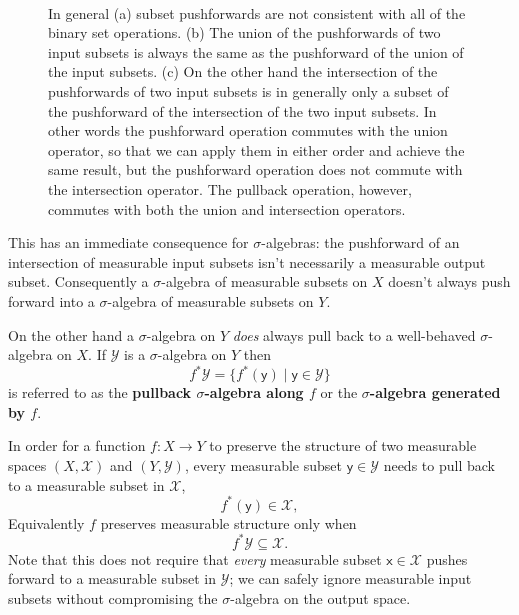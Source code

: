 \documentclass[
  letterpaper,
  DIV=11,
  numbers=noendperiod]{scrartcl}
\begin{document}
\begin{figure}
\begin{minipage}[t]{0.18\linewidth}
{\centering 

~

}

\end{minipage}%

\caption{\label{fig-set-op-consistency}In general (a) subset
pushforwards are not consistent with all of the binary set operations.
(b) The union of the pushforwards of two input subsets is always the
same as the pushforward of the union of the input subsets. (c) On the
other hand the intersection of the pushforwards of two input subsets is
in generally only a subset of the pushforward of the intersection of the
two input subsets. In other words the pushforward operation commutes
with the union operator, so that we can apply them in either order and
achieve the same result, but the pushforward operation does not commute
with the intersection operator. The pullback operation, however,
commutes with both the union and intersection operators.}

\end{figure}

This has an immediate consequence for \(\sigma\)-algebras: the
pushforward of an intersection of measurable input subsets isn't
necessarily a measurable output subset. Consequently a
\(\sigma\)-algebra of measurable subsets on \(X\) doesn't always push
forward into a \(\sigma\)-algebra of measurable subsets on \(Y\).

On the other hand a \(\sigma\)-algebra on \(Y\) \emph{does} always pull
back to a well-behaved \(\sigma\)-algebra on \(X\). If \(\mathcal{Y}\)
is a \(\sigma\)-algebra on \(Y\) then \[
f^{*} \mathcal{Y} =
\{ f^{*}(\mathsf{y}) \mid \mathsf{y} \in \mathcal{Y} \}
\] is referred to as the \textbf{pullback \(\sigma\)-algebra along
\(f\)} or the \textbf{\(\sigma\)-algebra generated by \(f\)}.

In order for a function \(f: X \rightarrow Y\) to preserve the structure
of two measurable spaces \((X, \mathcal{X})\) and \((Y, \mathcal{Y})\),
every measurable subset \(\mathsf{y} \in \mathcal{Y}\) needs to pull
back to a measurable subset in \(\mathcal{X}\), \[
f^{*}(\mathsf{y}) \in \mathcal{X},
\] Equivalently \(f\) preserves measurable structure only when \[
f^{*} \mathcal{Y} \subseteq \mathcal{X}.
\] Note that this does not require that \emph{every} measurable subset
\(\mathsf{x} \in \mathcal{X}\) pushes forward to a measurable subset in
\(\mathcal{Y}\); we can safely ignore measurable input subsets without
compromising the \(\sigma\)-algebra on the output space.
\end{document}
